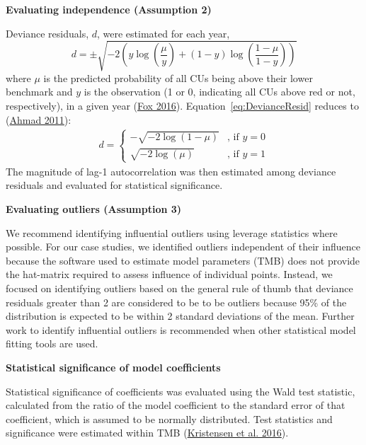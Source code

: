 \documentclass[11pt]{book}
\begin{document}
\textbf{Evaluating independence (Assumption 2)}

Deviance residuals, \(d\), were estimated for each year,
\begin{equation}
   d = \pm \sqrt { -2 ( y \log(\frac{\mu}{y}) + (1-y)\log(\frac{1-\mu}{1-y}) ) }
   \label{eq:DevianceResid}
\end{equation}
where \(\mu\) is the predicted probability of all CUs being above their lower benchmark and \(y\) is the observation (1 or 0, indicating all CUs above red or not, respectively), in a given year (\protect\hyperlink{ref-foxAppliedRegressionAnalysis2016}{Fox 2016}). Equation~\ref{eq:DevianceResid} reduces to (\protect\hyperlink{ref-ahmadDiagnosticResidualOutliers2011}{Ahmad 2011}):
\begin{align}
d = 
\begin{cases}
  - \sqrt { -2 \log(1-\mu) } & \text{, if } y = 0 \\
  \sqrt { -2 \log(\mu)  }  &\text{, if } y = 1
\end{cases}
  \label{eq:DevianceResidy}
\end{align}
The magnitude of lag-1 autocorrelation was then estimated among deviance residuals and evaluated for statistical significance.

\textbf{Evaluating outliers (Assumption 3)}

We recommend identifying influential outliers using leverage statistics where possible. For our case studies, we identified outliers independent of their influence because the software used to estimate model parameters (TMB) does not provide the hat-matrix required to assess influence of individual points. Instead, we focused on identifying outliers based on the general rule of thumb that deviance residuals greater than 2 are considered to be to be outliers because 95\% of the distribution is expected to be within 2 standard deviations of the mean. Further work to identify influential outliers is recommended when other statistical model fitting tools are used.

\textbf{Statistical significance of model coefficients}

Statistical significance of coefficients was evaluated using the Wald test statistic, calculated from the ratio of the model coefficient to the standard error of that coefficient, which is assumed to be normally distributed. Test statistics and significance were estimated within TMB (\protect\hyperlink{ref-kristensenTMBAutomaticDifferentiation2016}{Kristensen et al. 2016}).
\end{document}
